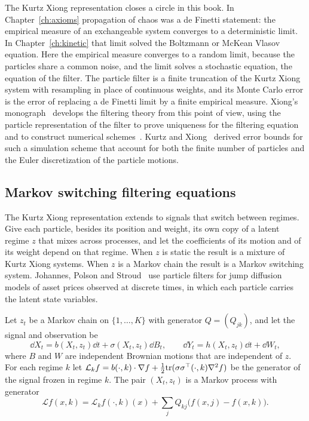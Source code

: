 The Kurtz Xiong representation closes a circle in this book. In Chapter~\ref{ch:axioms} propagation of chaos was a de Finetti statement: the empirical measure of an exchangeable system converges to a deterministic limit. In Chapter~\ref{ch:kinetic} that limit solved the Boltzmann or McKean Vlasov equation. Here the empirical measure converges to a random limit, because the particles share a common noise, and the limit solves a stochastic equation, the equation of the filter. The particle filter is a finite truncation of the Kurtz Xiong system with resampling in place of continuous weights, and its Monte Carlo error is the error of replacing a de Finetti limit by a finite empirical measure. Xiong's monograph~\cite{xiong2008} develops the filtering theory from this point of view, using the particle representation of the filter to prove uniqueness for the filtering equation and to construct numerical schemes~\cite[Chapters~7 and~8]{xiong2008}. Kurtz and Xiong~\cite{kurtzxiong2001} derived error bounds for such a simulation scheme that account for both the finite number of particles and the Euler discretization of the particle motions.

\subsection{Markov switching filtering equations}

The Kurtz Xiong representation extends to signals that switch between regimes. Give each particle, besides its position and weight, its own copy of a latent regime $z$ that mixes across processes, and let the coefficients of its motion and of its weight depend on that regime. When $z$ is static the result is a mixture of Kurtz Xiong systems. When $z$ is a Markov chain the result is a Markov switching system. Johannes, Polson and Stroud~\cite{jps2009} use particle filters for jump diffusion models of asset prices observed at discrete times, in which each particle carries the latent state variables.

Let $z_t$ be a Markov chain on $\{1,\dots,K\}$ with generator $Q = (Q_{jk})$, and let the signal and observation be
\[
\dd X_t = b(X_t,z_t)\dd t+\sigma(X_t,z_t)\dd B_t,\qquad\dd Y_t = h(X_t,z_t)\dd t+\dd W_t,
\]
where $B$ and $W$ are independent Brownian motions that are independent of $z$. For each regime $k$ let $\mathcal{L}_k f = b(\cdot,k)\cdot\nabla f+\frac12\mathrm{tr}(\sigma\sigma^\top(\cdot,k)\nabla^2f)$ be the generator of the signal frozen in regime $k$. The pair $(X_t,z_t)$ is a Markov process with generator
\[
\mathcal{L}f(x,k) = \mathcal{L}_kf(\cdot,k)(x)+\sum_jQ_{kj}\big(f(x,j)-f(x,k)\big).
\]


